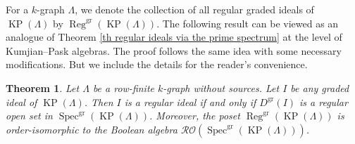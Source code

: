 \documentclass[a4paper,reqno,12pt]{amsart}
\numberwithin{equation}{section}
\newtheorem{thm}{Theorem}[section]
\theoremstyle{definition}
\theoremstyle{remark}
\newcommand{\Spec}{\operatorname{Spec}}
\newcommand{\reg}{\operatorname{Reg}}
\newcommand{\gr}{\operatorname{gr}}
\newcommand{\KP}{\operatorname{KP}}
\begin{document}
For a $k$-graph $\Lambda$, we denote the collection of all regular graded ideals of $\KP(\Lambda)$ by $\reg^{\gr}(\KP(\Lambda))$. The following result can be viewed as an analogue of Theorem \ref{th regular ideals via the prime spectrum} at the level of Kumjian--Pask algebras. The proof follows the same idea with some necessary modifications. But we include the details for the reader's convenience.
\begin{thm}\label{th regular ideal and spectrum of KPA}
Let $\Lambda$ be a row-finite $k$-graph without sources. Let $I$ be any graded ideal of $\KP(\Lambda)$. Then $I$ is a regular ideal if and only if $D^{\gr}(I)$ is a regular open set in $\Spec^{\gr}(\KP(\Lambda))$. Moreover, the poset $\reg^{\gr}(\KP(\Lambda))$ is order-isomorphic to the Boolean algebra $\mathcal{R}\mathcal{O}(\Spec^{\gr}(\KP(\Lambda)))$.     
\end{thm}
\end{document}
